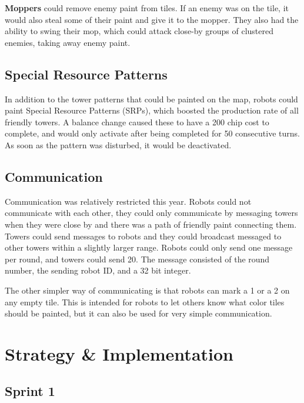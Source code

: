\documentclass{article}
\begin{document}
  \medskip

  \textbf{Moppers} could remove enemy paint from tiles. If an enemy was on the tile, it would also steal some of their paint and give it to the mopper. They also had the ability to swing their mop, which could attack close-by groups of clustered enemies, taking away enemy paint.

  \subsection{Special Resource Patterns}

  In addition to the tower patterns that could be painted on the map, robots could paint Special Resource Patterns (SRPs), which boosted the production rate of all friendly towers. A balance change caused these to have a 200 chip cost to complete, and would only activate after being completed for 50 consecutive turns. As soon as the pattern was disturbed, it would be deactivated.

  \subsection{Communication}

  Communication was relatively restricted this year. Robots could not communicate with each other, they could only communicate by messaging towers when they were close by and there was a path of friendly paint connecting them. Towers could send messages to robots and they could broadcast messaged to other towers within a slightly larger range. Robots could only send one message per round, and towers could send 20. The message consisted of the round number, the sending robot ID, and a 32 bit integer.

  \medskip

  The other simpler way of communicating is that robots can mark a 1 or a 2 on any empty tile. This is intended for robots to let others know what color tiles should be painted, but it can also be used for very simple communication.

  \section{Strategy \& Implementation}

  \subsection{Sprint 1}
\end{document}
